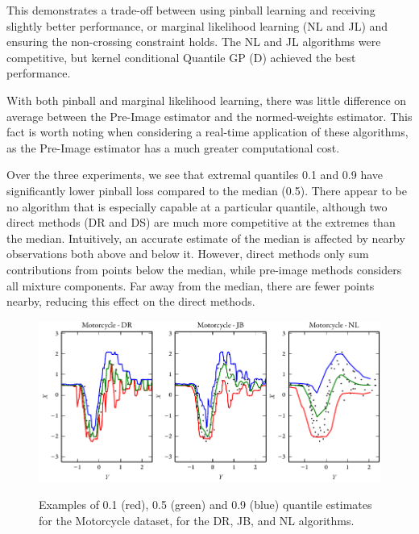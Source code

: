 \documentclass[twoside]{article} \usepackage{aistats2017}
\theoremstyle{definition}
\theoremstyle{theorem}
\begin{document}
		This demonstrates a trade-off between using pinball learning and receiving slightly better performance, or marginal likelihood learning (NL and JL) and ensuring the non-crossing constraint holds. The NL and JL algorithms were competitive, but kernel conditional Quantile GP (D) achieved the best performance.

		With both pinball and marginal likelihood learning, there was little difference on average between the Pre-Image estimator and the normed-weights estimator. This fact is worth noting when considering a real-time application of these algorithms, as the Pre-Image estimator has a much greater computational cost.
		
		Over the three experiments, we see that extremal quantiles 0.1 and 0.9 have significantly lower pinball loss compared to the median (0.5). There appear to be no algorithm that is especially capable at a particular quantile, although two direct methods (DR and DS) are much more competitive at the extremes than the median. Intuitively, an accurate estimate of the median is affected by nearby observations both above and below it. However, direct methods only sum contributions from points below the median, while pre-image methods considers all mixture components. Far away from the median, there are fewer points nearby, reducing this effect on the direct methods.
		
		
		\begin{figure}[t]
			\begin{center}
				\includegraphics[width=\columnwidth]{figures/mcquantilesall}\\
			\end{center}
			\caption{Examples of 0.1 (red), 0.5 (green) and 0.9 (blue) quantile estimates for the Motorcycle dataset, for the DR, JB, and NL algorithms.}
			\label{fig:motorcycleresults} 
		\end{figure}
		
\end{document}
